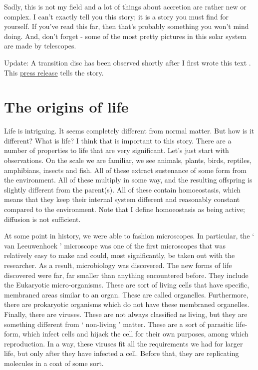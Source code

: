\begin{multicols}{2}
Sadly, this is not my field and a lot of things about accretion are rather new or complex. I can't exactly tell you this story; it is a story you must find for yourself. If you've read this far, then that's probably something you won't mind doing. And, don't forget - some of the most pretty pictures in this solar system are made by telescopes.

Update: A transition disc has been observed shortly after I first wrote this text \cite{naturetransitiondisc}. This \href{http://news.stanford.edu/pr/2015/pr-proto-planet-forming-111815.html}{press release} tells the story.

\section{The origins of life}
Life is intriguing. It seems completely different from normal matter. But how is it different? What is life? I think that is important to this story. There are a number of properties to life that are very significant. Let's just start with observations. On the scale we are familiar, we see animals, plants, birds, reptiles, amphibians, insects and fish. All of these extract sustenance of some form from the environment. All of these multiply in some way, and the resulting offspring is slightly different from the parent(s). All of these contain homoeostasis, which means that they keep their internal system different and reasonably constant compared to the environment. Note that I define homoeostasis as being active; diffusion is not sufficient.

At some point in history, we were able to fashion microscopes. In particular, the ‘ van Leeuwenhoek ’ microscope was one of the first microscopes that was relatively easy to make and could, most significantly, be taken out with the researcher. As a result, microbiology was discovered. The new forms of life discovered were far, far smaller than anything encountered before. They include the Eukaryotic micro-organisms. These are sort of living cells that have specific, membraned areas similar to an organ. These are called organelles. Furthermore, there are prokaryotic organisms which do not have these membraned organelles. Finally, there are viruses. These are not always classified as living, but they are something different from ‘ non-living ’ matter. These are a sort of parasitic life-form, which infect cells and hijack the cell for their own purposes, among which reproduction. In a way, these viruses fit all the requirements we had for larger life, but only after they have infected a cell. Before that, they are replicating molecules in a coat of some sort.


\end{multicols}
